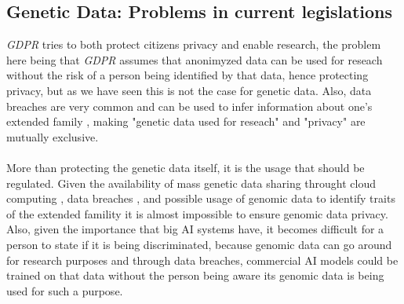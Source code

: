 \documentclass[12pt]{article}
\begin{document}
\subsection{Genetic Data: Problems in current legislations}
\emph{GDPR} tries to both protect citizens privacy and enable research, the problem here being that \emph{GDPR} assumes that anonimyzed data can be used for reseach without the risk of a person being 
identified by that data, hence protecting privacy, but as we have seen this is not the case for genetic data. \cite{anonymization}
Also, data breaches are very common \cite{data_breaches} and can be used to infer information about one's extended family \cite{understanding_genetics}\cite{genetic_discrimination_GINA},
making "genetic data used for reseach" and "privacy" are mutually exclusive.\\
\\
More than protecting the genetic data itself, it is the usage that should be regulated. Given the availability of mass genetic data sharing throught cloud computing \cite{genetic_data_misuse},
data breaches \cite{data_breaches}, and possible usage of genomic data to identify traits of the extended famility \cite{understanding_genetics}\cite{genetic_discrimination_GINA} it is almost impossible to ensure genomic data privacy.\\
Also, given the importance that big AI systems have, it becomes difficult for a person to state if it is being discriminated, 
because genomic data can go around for research purposes and through data breaches, commercial AI models could be trained on that data without the person being aware its genomic data
is being used for such a purpose.

\newpage
\end{document}
